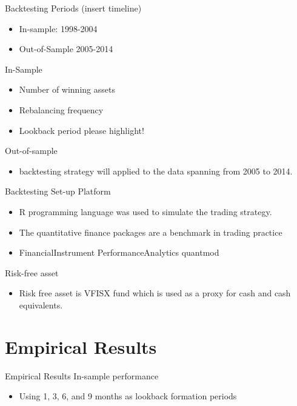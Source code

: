 \documentclass{beamer}
\begin{document}
\begin{frame}{Backtesting }
	Periods (insert timeline)
	\begin{itemize}
		\item In-sample: 1998-2004
		\item Out-of-Sample 2005-2014
	\end{itemize}
	In-Sample
	\begin{itemize}
		\item Number of winning assets 
		\item Rebalancing frequency
		\item Lookback period please highlight!
	\end{itemize}
	Out-of-sample
	\begin{itemize}
		\item backtesting strategy will applied to the data spanning from 2005 to 2014.
	\end{itemize}
\end{frame}

\begin{frame}{Backtesting Set-up}
	Platform
	\begin{itemize}
		\item R programming language was used to simulate the trading strategy. 
		\item The quantitative finance packages are a benchmark in trading practice 
		\item FinancialInstrument PerformanceAnalytics quantmod
	\end{itemize}
	Risk-free asset
	\begin{itemize}
		\item Risk free asset is VFISX fund which is used as a proxy for cash and cash equivalents.	
	\end{itemize}
\end{frame}

\section{Empirical Results}
\begin{frame}{Empirical Results}
	In-sample performance
	\begin{itemize}
		\item Using 1, 3, 6, and 9 months as lookback formation periods
		
		
	\end{itemize}
\end{frame}
\end{document}
